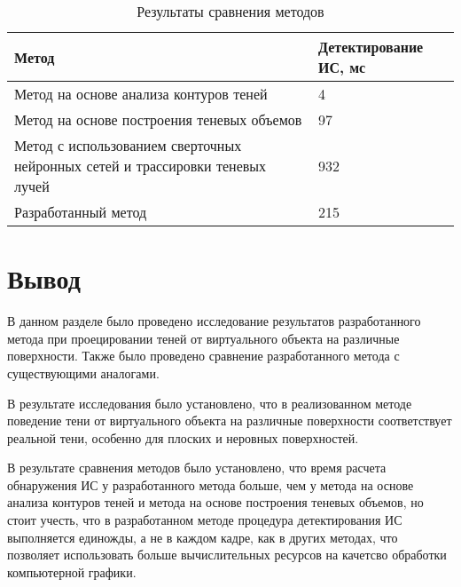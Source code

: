 \begin{table}[H]
	\caption{Результаты сравнения методов}
	\label{CompareMethods}
	\begin{center}
		\begin{tabular}{| p{8 cm} | p{3.5 cm} |} 
			\hline
			Метод & Детектирование ИС, мс \\
			\hline
			Метод на основе анализа контуров теней & 4 \\
			\hline
			Метод на основе построения теневых объемов & 97 \\
			\hline
			Метод с использованием сверточных нейронных сетей и трассировки теневых лучей & 932 \\
			\hline
			Разработанный метод & 215 \\
			\hline
		\end{tabular}
	\end{center}
\end{table}

\section{Вывод}

В данном разделе было проведено исследование результатов разработанного метода при проецировании теней от виртуального объекта на различные поверхности. Также было проведено сравнение разработанного метода с существующими аналогами.

В результате исследования было установлено, что в реализованном методе поведение тени от виртуального объекта на различные поверхности соответствует реальной тени, особенно для плоских и неровных поверхностей.

В результате сравнения методов было установлено, что время расчета обнаружения ИС у разработанного метода больше, чем у метода на основе анализа контуров теней и метода на основе построения теневых объемов, но стоит учесть, что в разработанном методе процедура детектирования ИС выполняется единожды, а не в каждом кадре, как в других методах, что позволяет использовать больше вычислительных ресурсов на качетсво обработки компьютерной графики.